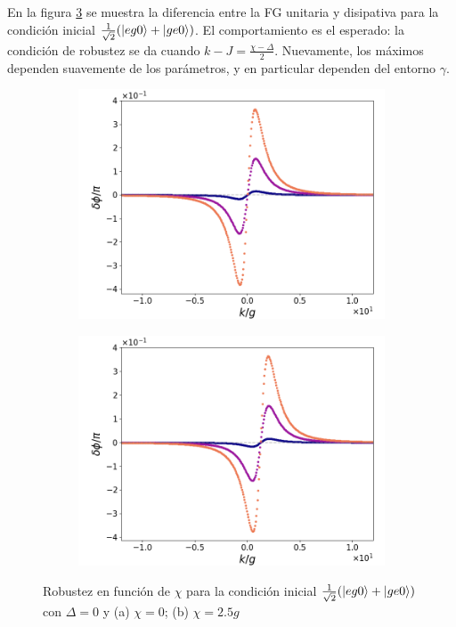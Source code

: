 En la figura \ref{fig5:robustez interaccion eg0} se muestra la diferencia entre la FG unitaria y disipativa para la condición inicial $\frac{1}{\sqrt{2}}(\ket{eg0}+\ket{ge0})$. El comportamiento es el esperado: la condición de robustez se da cuando $k-J=\frac{\chi-\Delta}{2}$. Nuevamente, los máximos dependen suavemente de los parámetros, y en particular dependen del entorno $\gamma$. 
\begin{figure}[h]
    \centering
    \begin{subfigure}{0.49\textwidth}
        \includegraphics[width=\textwidth]{figuras/ch5/robustez/k/eg0+ge0 d=2.5g x=2.5g J=0.0g.png}
        \caption{}
        \label{fig5:robustez interaccion 1 eg0}
    \end{subfigure}
    \hfill
    \begin{subfigure}{0.49\textwidth}
        \includegraphics[width=\textwidth]{figuras/ch5/robustez/k/eg0+ge0 d=0.0g x=2.5g J=0.0g.png}
        \caption{}
        \label{fig5:robustez interaccion 2 eg0}
    \end{subfigure}
    \caption{Robustez en función de $\chi$ para la condición inicial $\frac{1}{\sqrt{2}}(\ket{eg0}+\ket{ge0})$ con $\Delta=0$ y (a) $\chi=0$; (b) $\chi=2.5g$}
    \label{fig5:robustez interaccion eg0}
\end{figure}

